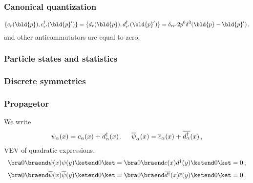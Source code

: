 \subsubsection{Canonical quantization}

\begin{equation}
\{ c_{r}(\bld{p}), c_{r'}^\dagger(\bld{p}') \}
=
\{ d_{r}(\bld{p}), d_{r'}^\dagger(\bld{p}') \}
=
\delta_{rr'} 2p^0 
\delta^3(\bld{p} - \bld{p}')\,,
\label{eqn:Dirc_creann}
\end{equation}
and other anticommutators are equal to zero.

\subsubsection{Particle states and statistics}

\subsubsection{Discrete symmetries}

\subsubsection{Propagetor}
We write 
\begin{eqnarray}
\psi_{\alpha}(x) = c_{\alpha}(x) + d_{\alpha}^\dagger(x)\,.
\hspace{5mm}
\overline{\psi}_{\alpha}(x) = \overline{c}_{\alpha}(x) + \overline{d_{\alpha}^\dagger}(x)\,,
\end{eqnarray}
VEV of quadratic expressions.
\begin{eqnarray}
\begin{array}{l}
\bra 0 \braend \psi(x) \psi(y) \ketend 0 \ket
=
\bra 0 \braend c(x) d^\dagger(y) \ketend 0 \ket
= 0 \,,
\vspace{2mm}
\\
\bra 0 \braend \overline{\psi}(x) \overline{\psi}(y) \ketend 0 \ket
=
\bra 0 \braend \overline{d^\dagger}(x) \overline{c}(y) \ketend 0 \ket
= 0 \,.
\end{array}
\end{eqnarray}


